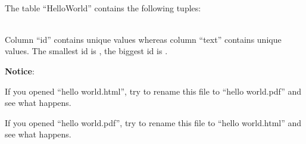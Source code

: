 \documentclass[10pt]{article}
\begin{document}
\\[3pt]

\noindent
The table ``HelloWorld'' contains the following  tuples:

\\[3pt]

\noindent Column ``id'' contains  unique values whereas column ``text'' contains  unique values. The smallest id is  , the biggest id is  .

\vspace*{0.5cm}
\noindent\textbf{Notice}:

\noindent If you opened ``hello world.html'', try to rename this file to ``hello world.pdf'' and see what happens.

\noindent If you opened ``hello world.pdf'', try to rename this file to ``hello world.html'' and see what happens.
\end{document}
